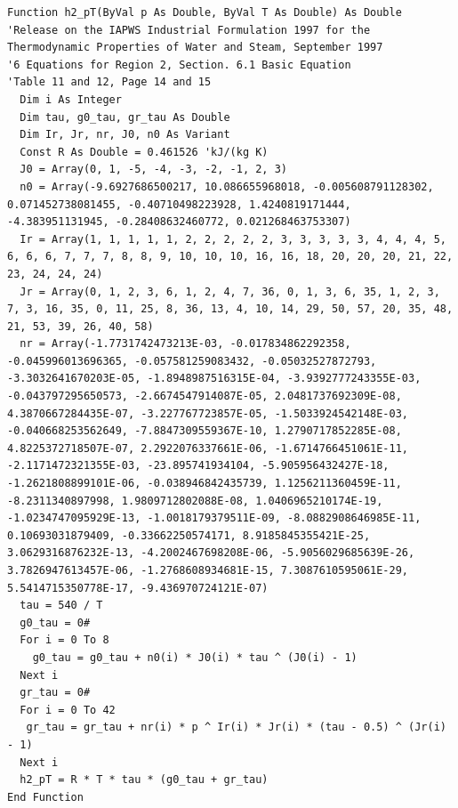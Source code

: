 \documentclass[10pt,a4paper]{article}
\begin{document}
\begin{lstlisting}
Function h2_pT(ByVal p As Double, ByVal T As Double) As Double
'Release on the IAPWS Industrial Formulation 1997 for the Thermodynamic Properties of Water and Steam, September 1997
'6 Equations for Region 2, Section. 6.1 Basic Equation
'Table 11 and 12, Page 14 and 15
  Dim i As Integer
  Dim tau, g0_tau, gr_tau As Double
  Dim Ir, Jr, nr, J0, n0 As Variant
  Const R As Double = 0.461526 'kJ/(kg K)
  J0 = Array(0, 1, -5, -4, -3, -2, -1, 2, 3)
  n0 = Array(-9.6927686500217, 10.086655968018, -0.005608791128302, 0.071452738081455, -0.40710498223928, 1.4240819171444, -4.383951131945, -0.28408632460772, 0.021268463753307)
  Ir = Array(1, 1, 1, 1, 1, 2, 2, 2, 2, 2, 3, 3, 3, 3, 3, 4, 4, 4, 5, 6, 6, 6, 7, 7, 7, 8, 8, 9, 10, 10, 10, 16, 16, 18, 20, 20, 20, 21, 22, 23, 24, 24, 24)
  Jr = Array(0, 1, 2, 3, 6, 1, 2, 4, 7, 36, 0, 1, 3, 6, 35, 1, 2, 3, 7, 3, 16, 35, 0, 11, 25, 8, 36, 13, 4, 10, 14, 29, 50, 57, 20, 35, 48, 21, 53, 39, 26, 40, 58)
  nr = Array(-1.7731742473213E-03, -0.017834862292358, -0.045996013696365, -0.057581259083432, -0.05032527872793, -3.3032641670203E-05, -1.8948987516315E-04, -3.9392777243355E-03, -0.043797295650573, -2.6674547914087E-05, 2.0481737692309E-08, 4.3870667284435E-07, -3.227767723857E-05, -1.5033924542148E-03, -0.040668253562649, -7.8847309559367E-10, 1.2790717852285E-08, 4.8225372718507E-07, 2.2922076337661E-06, -1.6714766451061E-11, -2.1171472321355E-03, -23.895741934104, -5.905956432427E-18, -1.2621808899101E-06, -0.038946842435739, 1.1256211360459E-11, -8.2311340897998, 1.9809712802088E-08, 1.0406965210174E-19, -1.0234747095929E-13, -1.0018179379511E-09, -8.0882908646985E-11, 0.10693031879409, -0.33662250574171, 8.9185845355421E-25, 3.0629316876232E-13, -4.2002467698208E-06, -5.9056029685639E-26, 3.7826947613457E-06, -1.2768608934681E-15, 7.3087610595061E-29, 5.5414715350778E-17, -9.436970724121E-07)
  tau = 540 / T
  g0_tau = 0#
  For i = 0 To 8
    g0_tau = g0_tau + n0(i) * J0(i) * tau ^ (J0(i) - 1)
  Next i
  gr_tau = 0#
  For i = 0 To 42
   gr_tau = gr_tau + nr(i) * p ^ Ir(i) * Jr(i) * (tau - 0.5) ^ (Jr(i) - 1)
  Next i
  h2_pT = R * T * tau * (g0_tau + gr_tau)
End Function
\end{lstlisting}
\end{document}
